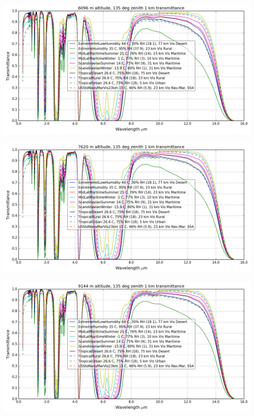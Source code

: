\documentclass{workpackage}
\begin{document}
\begin{center}
\includegraphics{./pic/Analyse-Standard-Atmospheres_17_15.png}
\end{center}

\begin{center}
\includegraphics{./pic/Analyse-Standard-Atmospheres_17_16.png}
\end{center}

\begin{center}
\includegraphics{./pic/Analyse-Standard-Atmospheres_17_17.png}
\end{center}
\end{document}
